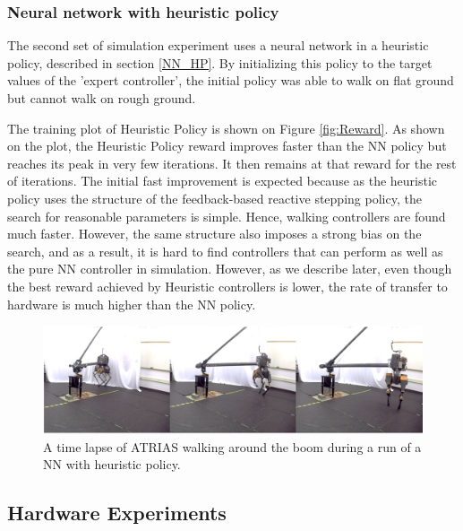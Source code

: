 \subsubsection{Neural network with heuristic policy}

The second set of simulation experiment uses a neural network in a heuristic policy, described in section \ref{NN_HP}. %
By initializing this policy to the target values of the 'expert controller', the initial policy was able to walk on flat ground but cannot walk on rough ground. %

The training plot of Heuristic Policy is shown on Figure \ref{fig:Reward}. As shown on the plot, the Heuristic Policy reward improves faster than the NN policy but reaches its peak in very few iterations. It then remains at that reward for the rest of iterations. The initial fast improvement is expected because as the heuristic policy uses the structure of the feedback-based reactive stepping policy, the search for reasonable parameters is simple. Hence, walking controllers are found much faster. However, the same structure also imposes a strong bias on the search, and as a result, it is hard to find controllers that can perform as well as the pure NN controller in simulation. However, as we describe later, even though the best reward achieved by Heuristic controllers is lower, the rate of transfer to hardware is much higher than the NN policy.

\begin{figure}[t]
	\centering
	\includegraphics[width=.85\textwidth]{img/Hardware.PNG}
    \caption{A time lapse of ATRIAS walking around the boom during a run of a NN with heuristic policy.}
    \label{fig:Hardware_walking}
\end{figure}

\subsection{Hardware Experiments}

